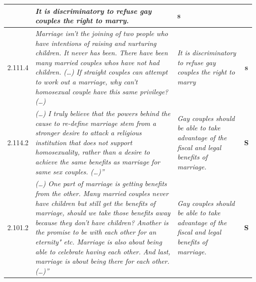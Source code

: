 \begin{table}[t]
{\begin{tabular}{@{}lp{9.5cm}p{3.5cm}c@{}}
& \normalsize{%
\textit{ It is discriminatory to refuse gay couples the right to marry.}
}
& \textbf{s} \\
\midrule
2.111.4 & \normalsize{%
\textit{
Marriage isn't the joining of two people who have intentions of raising
and nurturing children. It never has been. There have been many married couples
whos have not had children. (\dots) If straight couples can attempt to work out a
marriage, why can't homosexual couple have this same privilege? (\dots)
}} 
& \normalsize{%
\textit{
It is discriminatory to refuse gay couples the right to marry
}
}
& \textbf{s} \\
\midrule
2.114.2 & \normalsize{%
\textit{
(\dots) I truly believe that the powers
behind the cause to re-define marriage stem from a stronger desire to attack a
religious institution that does not support homosexuality, rather than a desire
to achieve the same benefits as marriage for same sex couples. (\dots)''} 
}
& \normalsize{%
\textit{
Gay couples should be able to take advantage of the fiscal and legal benefits
of marriage.} 
}
& \textbf{S} \\
\midrule
2.101.2
&
\normalsize{%
\textit{
(\dots) One part of marriage is getting benefits from the other. Many married
couples never have children but still get the benefits of marriage, should we
take those benefits away because they don't have children? Another is the
promise to be with each other for an eternity" etc. Marriage is also about
being able to celebrate having each other. And last, marriage is about being
there for each other. (\dots)''
}
}
&
\normalsize{%
\textit{
Gay couples should be able to take advantage of the fiscal and legal benefits
of marriage.
}
}
& \textbf{S} \\

\end{tabular}}
\end{table}
